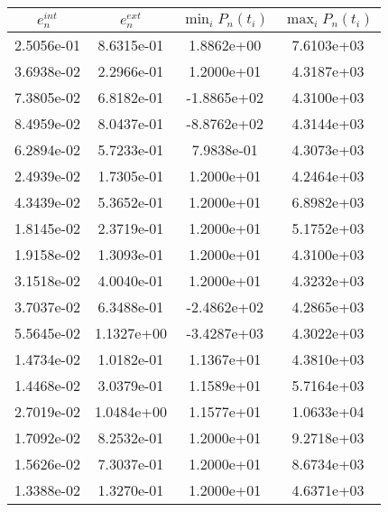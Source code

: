 \begin{table}
\centering
\begin{tabular}{||c|c||c|c||}
	\hline
	$e_n^{int}$ & $e_n^{ext}$ & $\min_i P_n(t_i)$ & $\max_i P_n(t_i)$ \\
	\hline\hline
	\cellcolor{red!25}2.5056e-01 & 8.6315e-01 & 1.8862e+00 & 7.6103e+03 \\
	\hline
	3.6938e-02 & 2.2966e-01 & 1.2000e+01 & 4.3187e+03 \\
	\hline
	7.3805e-02 & 6.8182e-01 & -1.8865e+02 & 4.3100e+03 \\
	\hline
	8.4959e-02 & 8.0437e-01 & -8.8762e+02 & 4.3144e+03 \\
	\hline
	6.2894e-02 & 5.7233e-01 & 7.9838e-01 & 4.3073e+03 \\
	\hline
	2.4939e-02 & 1.7305e-01 & \cellcolor{red!25}1.2000e+01 & \cellcolor{blue!25}4.2464e+03 \\
	\hline
	4.3439e-02 & 5.3652e-01 & 1.2000e+01 & 6.8982e+03 \\
	\hline
	1.8145e-02 & 2.3719e-01 & 1.2000e+01 & 5.1752e+03 \\
	\hline
	1.9158e-02 & 1.3093e-01 & 1.2000e+01 & 4.3100e+03 \\
	\hline
	3.1518e-02 & 4.0040e-01 & 1.2000e+01 & 4.3232e+03 \\
	\hline
	3.7037e-02 & 6.3488e-01 & -2.4862e+02 & 4.2865e+03 \\
	\hline
	5.5645e-02 & \cellcolor{red!25}1.1327e+00 & \cellcolor{blue!25}-3.4287e+03 & 4.3022e+03 \\
	\hline
	1.4734e-02 & \cellcolor{blue!25}1.0182e-01 & 1.1367e+01 & 4.3810e+03 \\
	\hline
	1.4468e-02 & 3.0379e-01 & 1.1589e+01 & 5.7164e+03 \\
	\hline
	2.7019e-02 & 1.0484e+00 & 1.1577e+01 & \cellcolor{red!25}1.0633e+04 \\
	\hline
	1.7092e-02 & 8.2532e-01 & 1.2000e+01 & 9.2718e+03 \\
	\hline
	1.5626e-02 & 7.3037e-01 & 1.2000e+01 & 8.6734e+03 \\
	\hline
	\cellcolor{blue!25}1.3388e-02 & 1.3270e-01 & 1.2000e+01 & 4.6371e+03 \\
	\hline
\end{tabular}
\caption{}
\label{tab:interp}
\end{table}